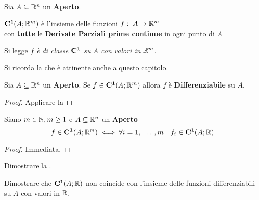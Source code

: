 \begin{definition}
	\label{def:cnt_class_1}
	Sia $A \subseteq \mathbb{R}^n$ un \textbf{Aperto}.
	\begin{center}
		$\mathbf{C^{1}}(A; \mathbb{R}^m)$ è l'insieme delle funzioni $f:\; A \to \mathbb{R}^m$\\
		con \textbf{tutte} le \textbf{Derivate Parziali prime continue} in ogni punto di $A$
	\end{center}
	Si legge \textit{$f$ è di classe $\mathbf{C^{1}}$ su $A$ con valori in $\mathbb{R}^m$}.
\end{definition}
\begin{observation}
	Si ricorda la  che è attinente anche a questo capitolo.
\end{observation}
\begin{corollary}
	Sia $A \subseteq \mathbb{R}^n$ un \textbf{Aperto}. Se $f \in \mathbf{C^{1}}(A;\mathbb{R}^m)$ allora $f$ è \textbf{Differenziabile} su $A$.
	\begin{proof}
		Applicare la 
	\end{proof}
\end{corollary}
\begin{proposition}
	\label{prop:cnt_class_components}
	Siano $m \in \mathbb{N}, m \geq 1$ e $A \subseteq \mathbb{R}^n$ un \textbf{Aperto}
	\[f \in \mathbf{C^{1}}(A; \mathbb{R}^m) \iff \forall i = 1,\:\dotsc\:, m \quad f_i \in \mathbf{C^{1}}(A;\mathbb{R})\]
	\begin{proof}
		Immediata.
	\end{proof}
\end{proposition}
\begin{exercise}
	Dimostrare la .
\end{exercise}
\begin{exercise}
	Dimostrare che $\mathbf{C^{1}}(A;\mathbb{R})$ non coincide con l'insieme delle funzioni differenziabili su $A$ con valori in $\mathbb{R}$.
\end{exercise}

